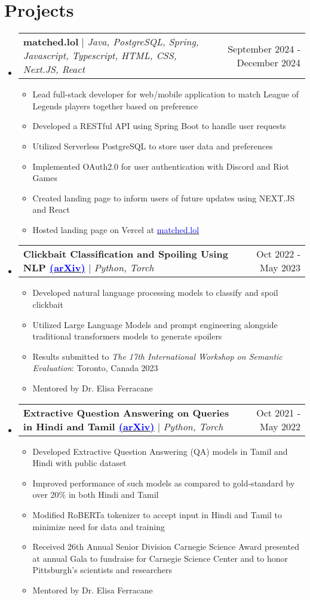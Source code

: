 \documentclass{article}
\makeatletter
\newcommand{\resumeItem}[1]{
  \item\small{
    {#1 \vspace{-2pt}}
  }
}
\newcommand{\resumeProjectHeading}[2]{
    \item
    \begin{tabular*}{0.97\textwidth}{l@{\extracolsep{\fill}}r}
      \small#1 & #2 \\
    \end{tabular*}\vspace{-7pt}
}
\newcommand{\resumeSubHeadingListStart}{\begin{itemize}[leftmargin=0.15in, label={}]}
\newcommand{\resumeSubHeadingListEnd}{\end{itemize}}
\newcommand{\resumeItemListStart}{\begin{itemize}}
\newcommand{\resumeItemListEnd}{\end{itemize}\vspace{-5pt}}
\makeatother
\begin{document}
\section{Projects}
\resumeSubHeadingListStart
\resumeProjectHeading
{\textbf{matched.lol} $|$ {\small\footnotesize\emph{Java, PostgreSQL, Spring, Javascript, Typescript, HTML, CSS, Next.JS, React}}}{September 2024 - December 2024}
\resumeItemListStart
\resumeItem{Lead full-stack developer for web/mobile application to match League of Legends players together based on preference}
\resumeItem{Developed a RESTful API using Spring Boot to handle user requests}
\resumeItem{Utilized Serverless PostgreSQL to store user data and preferences}
\resumeItem{Implemented OAuth2.0 for user authentication with Discord and Riot Games}
\resumeItem{Created landing page to inform users of future updates using NEXT.JS and React}
\resumeItem{Hosted landing page on Vercel at \href{https://matched.lol}{\textcolor{blue}{matched.lol}}}
\resumeItemListEnd
\resumeProjectHeading
{\textbf{Clickbait Classification and Spoiling Using NLP \href{https://doi.org/10.48550/arXiv.2306.14907}{\textcolor{blue}{(arXiv)}}} $|$ {\small\footnotesize\emph{Python, Torch}}}{Oct 2022 - May 2023}
\resumeItemListStart
\resumeItem{Developed natural language processing models to classify and spoil clickbait}
\resumeItem{Utilized Large Language Models and prompt engineering alongside traditional transformers models to generate spoilers}
\resumeItem{Results submitted to \textit{The 17th International Workshop on Semantic Evaluation}: Toronto, Canada 2023}
\resumeItem{Mentored by Dr. Elisa Ferracane}
\resumeItemListEnd
\resumeProjectHeading
{\textbf{Extractive Question Answering on Queries in Hindi and Tamil \href{https://doi.org/10.48550/arXiv.2210.06356}{\textcolor{blue}{(arXiv)}}} $|$ \footnotesize\emph{Python, Torch}}{Oct 2021 - May 2022}
\resumeItemListStart
\resumeItem{Developed Extractive Question Answering (QA) models in Tamil and Hindi with public dataset}
\resumeItem{Improved performance of such models as compared to gold-standard by over 20\% in both Hindi and Tamil}
\resumeItem{Modified RoBERTa tokenizer to accept input in Hindi and Tamil to minimize need for data and training}
\resumeItem{Received 26th Annual Senior Division Carnegie Science Award presented at annual Gala to fundraise for Carnegie Science Center and to honor Pittsburgh's scientists and researchers}
\resumeItem{Mentored by Dr. Elisa Ferracane}
\resumeItemListEnd
\resumeSubHeadingListEnd
\vspace{-10pt}
\end{document}
